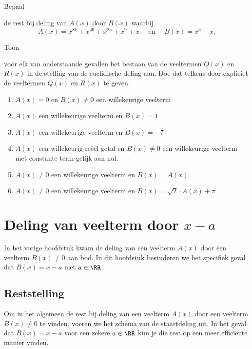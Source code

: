 \documentclass{ximera}
\begin{document}
\begin{Oefening}\setcounter{enumi}{19}
\hypertarget{oef2.19}{Bepaal} de rest bij deling van $A(x)$ door $B(x)$ waarbij
\[
A(x) = x^{81} + x^{49} + x^{25} + x^{9} + x \quad \text{ en } \quad B(x) = x^3-x.
\]
\end{Oefening}

\begin{Oefening}\setcounter{enumi}{20}
\hypertarget{oef2.20}{Toon} voor elk van onderstaande gevallen het bestaan van de veeltermen $Q(x)$ en $R(x)$ in de stelling van de euclidische deling aan. Doe dat telkens door expliciet de veeltermen $Q(x)$ en $R(x)$ te geven. 
\begin{enumerate}
\item
$A(x) = 0$ en $B(x) \neq 0$ een willekeurige veelterm 
\item
$A(x)$ een willekeurige veelterm en $B(x) = 1$
\item
$A(x)$ een willekeurige veelterm en $B(x) = -7$
\item
$A(x)$ een willekeurig re\"eel getal en $B(x) \neq 0$ een willekeurige veelterm met constante term gelijk aan nul.
\item
$A(x) \neq 0$ een willekeurige veelterm en $B(x) = A(x)$
\item
$A(x) \neq 0$ een willekeurige veelterm en $B(x) = \sqrt{2}\cdot A(x)+\pi$
\end{enumerate}
\end{Oefening}

\chapter{Deling van veelterm door \texorpdfstring{$x-a$}{x-a}}

In het vorige hoofdstuk kwam de deling van een veelterm $A(x)$ door een veelterm $B(x) \neq 0$ aan bod. In dit hoofdstuk bestuderen we het specifiek geval dat $B(x) = x-a$ met $a \in \RR$.

\section{Reststelling}

Om in het algemeen de rest bij deling van een veelterm $A(x)$ door een veelterm $B(x) \neq 0$ te vinden, voeren we het schema van de staartdeling uit. In het geval dat $B(x) = x-a$ voor een zekere $a \in \RR$ kun je die rest op een meer effici\"ente manier vinden.
\end{document}
